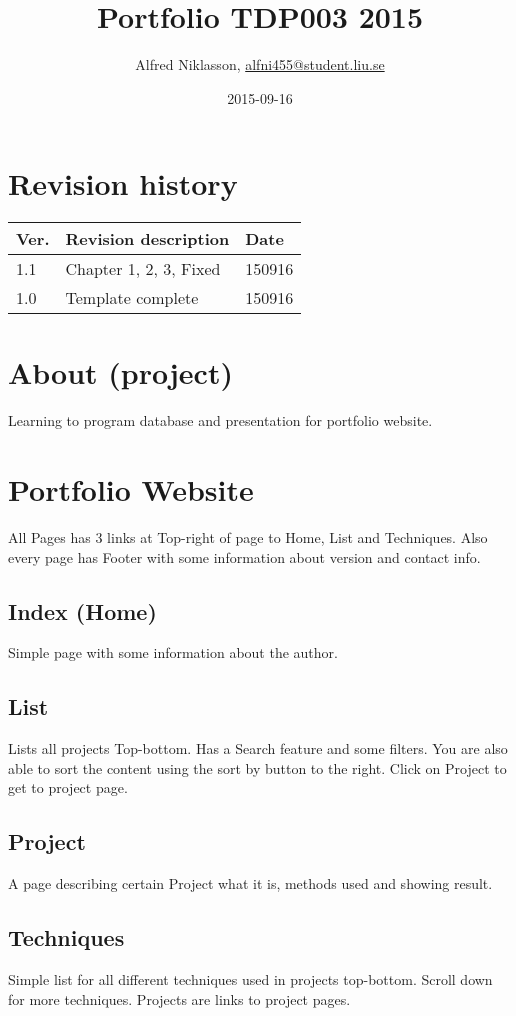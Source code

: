 \documentclass{TDP003mall}
\author{Alfred Niklasson, \url{alfni455@student.liu.se}}
\title{Portfolio TDP003 2015}
\date{2015-09-16}
\begin{document}
\projectpage
\section{Revision history}
\begin{table}[!h]
\begin{tabularx}{\linewidth}{|l|X|l|}
\hline
Ver. & Revision description & Date \\\hline
1.1 & Chapter 1, 2, 3, Fixed & 150916 \\\hline
1.0 & Template complete & 150916 \\\hline
\end{tabularx}
\end{table}


\section{About (project)}

Learning to program database and presentation for portfolio website.

\section{Portfolio Website}
All Pages has 3 links at Top-right of page to Home, List and Techniques. Also every page has Footer with some information about version and contact info.

\subsection{Index (Home)}
Simple page with some information about the author.

\subsection {List}
Lists all projects Top-bottom. Has a Search feature and some filters. 
You are also able to sort the content using the sort by button to the right.
Click on Project to get to project page.
\subsection {Project}
A page describing certain Project what it is, methods used and showing result.
\subsection {Techniques}
Simple list for all different techniques used in projects top-bottom. Scroll down for more techniques. Projects are links to project pages.
\end{document}
